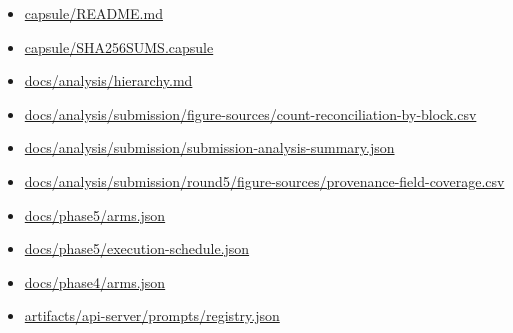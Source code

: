 \documentclass[11pt]{article}
\begin{document}
\begin{itemize}
\item
  \href{https://github.com/yoheinakajima/synthetic-players/blob/62ab90beff1d291b069c87f13b6b6b3495171ddd/capsule/README.md}{capsule/README.md}
\item
  \href{https://github.com/yoheinakajima/synthetic-players/blob/62ab90beff1d291b069c87f13b6b6b3495171ddd/capsule/SHA256SUMS.capsule}{capsule/SHA256SUMS.capsule}
\item
  \href{https://github.com/yoheinakajima/synthetic-players/blob/62ab90beff1d291b069c87f13b6b6b3495171ddd/docs/analysis/hierarchy.md}{docs/analysis/hierarchy.md}
\item
  \href{https://github.com/yoheinakajima/synthetic-players/blob/62ab90beff1d291b069c87f13b6b6b3495171ddd/docs/analysis/submission/figure-sources/count-reconciliation-by-block.csv}{docs/analysis/submission/figure-sources/count-reconciliation-by-block.csv}
\item
  \href{https://github.com/yoheinakajima/synthetic-players/blob/62ab90beff1d291b069c87f13b6b6b3495171ddd/docs/analysis/submission/submission-analysis-summary.json}{docs/analysis/submission/submission-analysis-summary.json}
\item
  \href{https://github.com/yoheinakajima/synthetic-players/blob/62ab90beff1d291b069c87f13b6b6b3495171ddd/docs/analysis/submission/round5/figure-sources/provenance-field-coverage.csv}{docs/analysis/submission/round5/figure-sources/provenance-field-coverage.csv}
\item
  \href{https://github.com/yoheinakajima/synthetic-players/blob/62ab90beff1d291b069c87f13b6b6b3495171ddd/docs/phase5/arms.json}{docs/phase5/arms.json}
\item
  \href{https://github.com/yoheinakajima/synthetic-players/blob/62ab90beff1d291b069c87f13b6b6b3495171ddd/docs/phase5/execution-schedule.json}{docs/phase5/execution-schedule.json}
\item
  \href{https://github.com/yoheinakajima/synthetic-players/blob/62ab90beff1d291b069c87f13b6b6b3495171ddd/docs/phase4/arms.json}{docs/phase4/arms.json}
\item
  \href{https://github.com/yoheinakajima/synthetic-players/blob/62ab90beff1d291b069c87f13b6b6b3495171ddd/artifacts/api-server/prompts/registry.json}{artifacts/api-server/prompts/registry.json}
\end{itemize}
\end{document}

